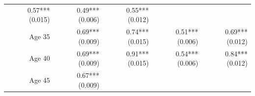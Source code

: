 \documentclass[]{article}
\begin{document}
\begin{longtable}[c]{@{}rrrrr@{}}
\begin{minipage}[t]{0.16\columnwidth}
0.57*** (0.015)
\strut\end{minipage} &
\begin{minipage}[t]{0.18\columnwidth}\raggedleft\strut
0.49*** (0.006)
\strut\end{minipage} &
\begin{minipage}[t]{0.15\columnwidth}\raggedleft\strut
0.55*** (0.012)
\strut\end{minipage}\tabularnewline
\begin{minipage}[t]{0.17\columnwidth}\raggedleft\strut
Age 35
\strut\end{minipage} &
\begin{minipage}[t]{0.20\columnwidth}\raggedleft\strut
0.69*** (0.009)
\strut\end{minipage} &
\begin{minipage}[t]{0.16\columnwidth}\raggedleft\strut
0.74*** (0.015)
\strut\end{minipage} &
\begin{minipage}[t]{0.18\columnwidth}\raggedleft\strut
0.51*** (0.006)
\strut\end{minipage} &
\begin{minipage}[t]{0.15\columnwidth}\raggedleft\strut
0.69*** (0.012)
\strut\end{minipage}\tabularnewline
\begin{minipage}[t]{0.17\columnwidth}\raggedleft\strut
Age 40
\strut\end{minipage} &
\begin{minipage}[t]{0.20\columnwidth}\raggedleft\strut
0.69*** (0.009)
\strut\end{minipage} &
\begin{minipage}[t]{0.16\columnwidth}\raggedleft\strut
0.91*** (0.015)
\strut\end{minipage} &
\begin{minipage}[t]{0.18\columnwidth}\raggedleft\strut
0.54*** (0.006)
\strut\end{minipage} &
\begin{minipage}[t]{0.15\columnwidth}\raggedleft\strut
0.84*** (0.012)
\strut\end{minipage}\tabularnewline
\begin{minipage}[t]{0.17\columnwidth}\raggedleft\strut
Age 45
\strut\end{minipage} &
\begin{minipage}[t]{0.20\columnwidth}\raggedleft\strut
0.67*** (0.009)
\strut\end{minipage} &
\begin{minipage}[t]{0.16\columnwidth}\raggedleft\strut

\end{minipage}
\end{longtable}
\end{document}
